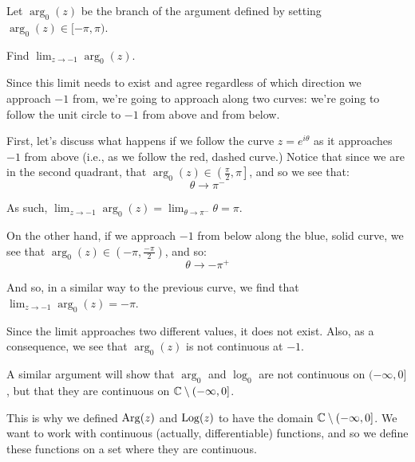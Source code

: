 \begin{ex}{}{} Let $\arg_0(z)$ be the branch of the argument defined by setting $\arg_0(z) \in [-\pi,\pi)$.

Find $\lim_{z\rightarrow -1} \arg_0(z)$.

Since this limit needs to exist and agree regardless of which direction we approach $-1$ from, we're going to approach along two curves: we're going to follow the unit circle to $-1$ from above and from below.

\begin{center}
\end{center}


First, let's discuss what happens if we follow the curve $z = e^{i\theta}$ as it approaches $-1$ from above (i.e., as we follow the red, dashed curve.) Notice that since we are in the second quadrant, that $\arg_0(z) \in \left(\frac{\pi}{2},\pi\right]$, and so we see that:
$$\theta \rightarrow \pi^{-}$$

As such, $\lim_{z\rightarrow -1} \arg_0(z) = \lim_{\theta \rightarrow \pi^-} \theta = \pi$.

On the other hand, if we approach $-1$ from below along the blue, solid curve, we see that $\arg_0(z) \in \left(-\pi,\frac{-\pi}{2}\right)$, and so:
$$\theta\rightarrow -\pi^+$$

And so, in a similar way to the previous curve, we find that $\lim_{z\rightarrow -1} \arg_0(z) = -\pi$.

Since the limit approaches two different values, it does not exist. Also, as a consequence, we see that $\arg_0(z)$ is not continuous at $-1$.
\end{ex}

\begin{note} A similar argument will show that $\arg_0$ and $\log_0$ are not continuous on $(-\infty,0]$, but that they are continuous on $\mathbb{C} \setminus (-\infty, 0]$.

This is why we defined $\mathrm{Arg}(z)$ and $\mathrm{Log}(z)$ to have the domain $\mathbb{C}\setminus (-\infty,0]$. We want to work with continuous (actually, differentiable) functions, and so we define these functions on a set where they are continuous.\end{note}

